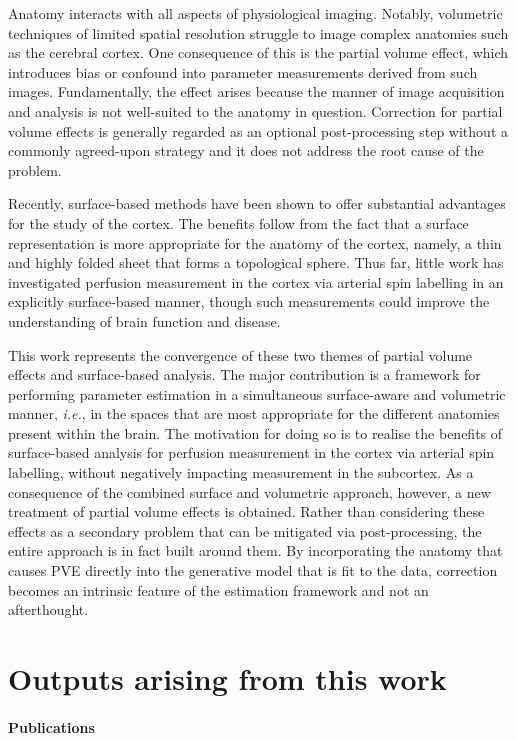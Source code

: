 \documentclass[12pt]{report}
\begin{document}
Anatomy interacts with all aspects of physiological imaging. Notably, volumetric techniques of limited spatial resolution struggle to image complex anatomies such as the cerebral cortex. One consequence of this is the partial volume effect, which introduces bias or confound into parameter measurements derived from such images. Fundamentally, the effect arises because the manner of image acquisition and analysis is not well-suited to the anatomy in question. Correction for partial volume effects is generally regarded as an optional post-processing step without a commonly agreed-upon strategy and it does not address the root cause of the problem. 

Recently, surface-based methods have been shown to offer substantial advantages for the study of the cortex. The benefits follow from the fact that a surface representation is more appropriate for the anatomy of the cortex, namely, a thin and highly folded sheet that forms a topological sphere. Thus far, little work has investigated perfusion measurement in the cortex via arterial spin labelling in an explicitly surface-based manner, though such measurements could improve the understanding of brain function and disease. 

This work represents the convergence of these two themes of partial volume effects and surface-based analysis. The major contribution is a framework for performing parameter estimation in a simultaneous surface-aware and volumetric manner, \textit{i.e.}, in the spaces that are most appropriate for the different anatomies present within the brain. The motivation for doing so is to realise the benefits of surface-based analysis for perfusion measurement in the cortex via arterial spin labelling, without negatively impacting measurement in the subcortex. As a consequence of the combined surface and volumetric approach, however, a new treatment of partial volume effects is obtained. Rather than considering these effects as a secondary problem that can be mitigated via post-processing, the entire approach is in fact built around them. By incorporating the anatomy that causes PVE directly into the generative model that is fit to the data, correction becomes an intrinsic feature of the estimation framework and not an afterthought. 

\chapter*{Outputs arising from this work}

\subsubsection{Publications} 
\end{document}
